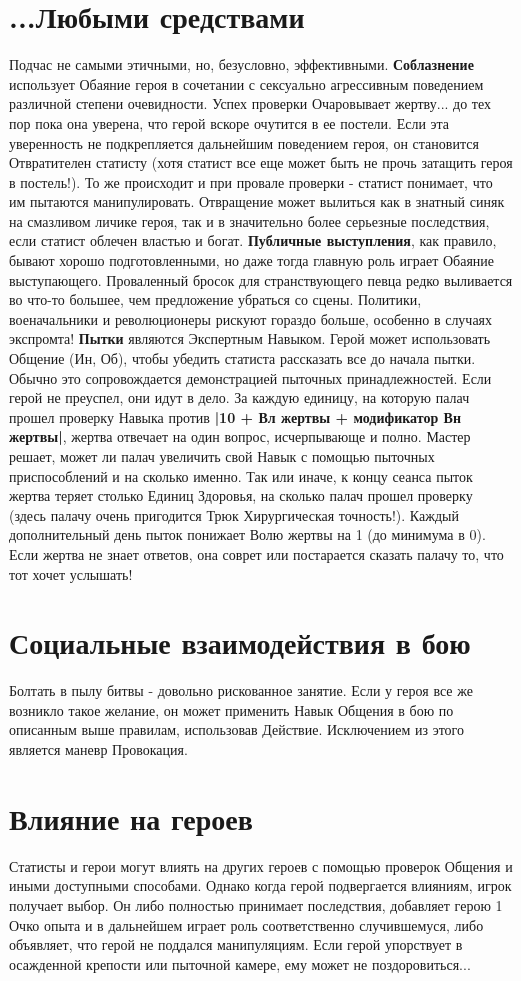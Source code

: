 \section{...Любыми средствами}
Подчас не самыми этичными, но, безусловно, эффективными.
\newline \textbf{Соблазнение} использует Обаяние героя в сочетании с сексуально агрессивным поведением различной степени очевидности. Успех проверки Очаровывает жертву... до тех пор пока она уверена, что герой вскоре очутится в ее постели. Если эта уверенность не подкрепляется дальнейшим поведением героя, он становится Отвратителен статисту (хотя статист все еще может быть не прочь затащить героя в постель!). То же происходит и при провале проверки - статист понимает, что им пытаются манипулировать. Отвращение может вылиться как в знатный синяк на смазливом личике героя, так и в значительно более серьезные последствия, если статист облечен властью и богат.
\newline \textbf{Публичные выступления}, как правило, бывают хорошо подготовленными, но даже тогда главную роль играет Обаяние выступающего. Проваленный бросок для странствующего певца редко выливается во что-то большее, чем предложение убраться со сцены. Политики, военачальники и революционеры рискуют гораздо больше, особенно в случаях экспромта!
\newline \textbf{Пытки} являются Экспертным Навыком. Герой может использовать Общение (Ин, Об), чтобы убедить статиста рассказать все до начала пытки. Обычно это сопровождается демонстрацией пыточных принадлежностей. Если герой не преуспел, они идут в дело. За каждую единицу, на которую палач прошел проверку Навыка против \textbf{|10 + Вл жертвы + модификатор Вн жертвы|}, жертва отвечает на один вопрос, исчерпывающе и полно. Мастер решает, может ли палач увеличить свой Навык с помощью пыточных приспособлений и на сколько именно. Так или иначе, к концу сеанса пыток жертва теряет столько Единиц Здоровья, на сколько палач прошел проверку (здесь палачу очень пригодится Трюк Хирургическая точность!). Каждый дополнительный день пыток понижает Волю жертвы на 1 (до минимума в 0). Если жертва не знает ответов, она соврет или постарается сказать палачу то, что тот хочет услышать!
\section{Социальные взаимодействия в бою}
Болтать в пылу битвы - довольно рискованное занятие. Если у героя все же возникло такое желание, он может применить Навык Общения в бою по описанным выше правилам, использовав Действие. Исключением из этого является маневр Провокация.
\section{Влияние на героев}
Статисты и герои могут влиять на других героев с помощью проверок Общения и иными доступными способами. Однако когда герой подвергается влияниям, игрок получает выбор. Он либо полностью принимает последствия, добавляет герою 1 Очко опыта и в дальнейшем играет роль соответственно случившемуся, либо объявляет, что герой не поддался манипуляциям. Если герой упорствует в осажденной крепости или пыточной камере, ему может не поздоровиться...